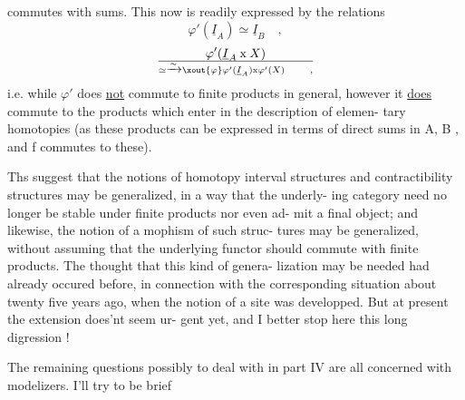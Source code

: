 commutes with sums.  This now is readily expressed by the relations
\[ \varphi'(\underline{I}_A) \simeq \underline{I}_B \quad , \]
\[ \varphi'(\underline{I}_A \mathbin{\mathrm{x}} X) \over{\simeq}{\xrightarrow{\sim}} \xout{\varphi} \varphi'(\underline{I}_A)\mathbin{\mathrm{x}}\varphi'(X) \qquad , \]
i.e.  while $\varphi'$  does \uline{not} commute to finite products in general,  however
it \uline{does} commute to the products which enter in the description of elemen-%
tary homotopies (as these products can be expressed in terms of direct
sums in  A, B ,  and f commutes to these).

Ths  suggest that the notions of homotopy interval structures and
contractibility structures may be generalized,  in a way that the underly-%
ing category need no longer  be stable under finite products nor even ad-%
mit a final object;  and likewise,  the notion of a mophism of such struc-%
tures may be generalized,  without assuming that the underlying functor
should commute with finite products. The thought that this kind of genera-%
lization may be needed had already occured before, in connection with
the corresponding situation about twenty five years ago,  when the notion
of a site was developped.  But at present the extension does'nt seem ur-%
gent yet,  and I better stop  here this long digression !

The remaining questions  possibly to deal with in part IV  are all
concerned with modelizers.   I'll try to be brief\hand{!}


